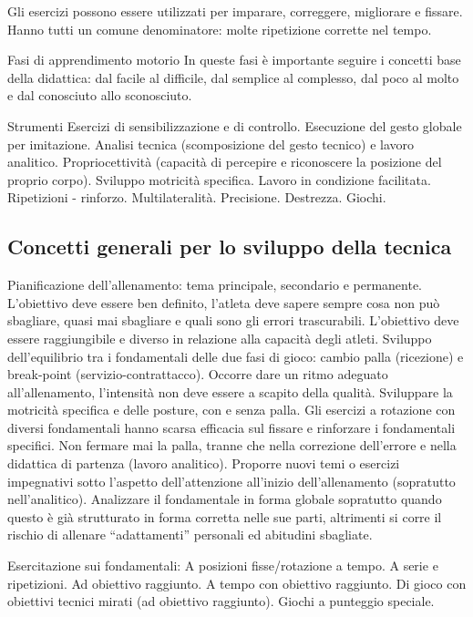 Gli esercizi possono essere utilizzati per imparare, correggere, migliorare e fissare. Hanno tutti un comune denominatore: molte ripetizione corrette nel tempo.

Fasi di apprendimento motorio
In queste fasi è importante seguire i concetti base della didattica: dal facile al difficile, dal semplice al complesso, dal poco al molto e dal conosciuto allo sconosciuto.

Strumenti
Esercizi di sensibilizzazione e di controllo.
Esecuzione del gesto globale per imitazione.
Analisi tecnica (scomposizione del gesto tecnico) e lavoro analitico.
Propriocettività (capacità di percepire e riconoscere la posizione del proprio corpo).
Sviluppo motricità specifica.
Lavoro in condizione facilitata.
Ripetizioni - rinforzo.
Multilateralità.
Precisione.
Destrezza.
Giochi.


\subsection{Concetti generali per lo sviluppo della tecnica}
Pianificazione dell'allenamento: tema principale, secondario e permanente. L'obiettivo deve essere ben definito, l'atleta deve sapere sempre cosa non può sbagliare, quasi mai sbagliare e quali sono gli errori trascurabili. L'obiettivo deve essere raggiungibile e diverso in relazione alla capacità degli atleti.
Sviluppo dell'equilibrio  tra i fondamentali delle due fasi di gioco: cambio palla (ricezione) e break-point (servizio-contrattacco).
Occorre dare un ritmo adeguato all'allenamento, l'intensità non deve essere a scapito della qualità. Sviluppare la motricità specifica e delle posture, con e senza palla.
Gli esercizi a rotazione con diversi fondamentali hanno scarsa efficacia sul fissare e rinforzare i fondamentali specifici. Non fermare mai la palla, tranne che nella correzione dell'errore e nella didattica di partenza (lavoro analitico).
Proporre nuovi temi o esercizi impegnativi sotto l'aspetto dell'attenzione all'inizio dell'allenamento (sopratutto nell'analitico).
Analizzare il fondamentale in forma globale sopratutto quando questo è già strutturato in forma corretta nelle sue parti, altrimenti si corre il rischio di allenare “adattamenti” personali
ed abitudini sbagliate.

Esercitazione sui fondamentali:
A posizioni fisse/rotazione a tempo.
A serie e ripetizioni.
Ad obiettivo raggiunto.
A tempo con obiettivo raggiunto.
Di gioco con obiettivi tecnici mirati (ad obiettivo raggiunto).
Giochi a punteggio speciale.


